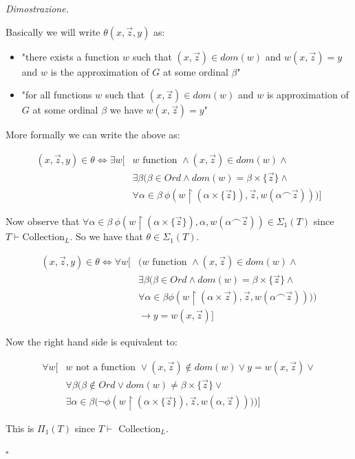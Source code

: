 \documentclass[a4paper,12pt]{article}
\newenvironment{proof}
  {\par\vspace{0.5em}\noindent\textit{Dimostrazione.} }
  {\par\vspace{1em}\hfill$\square$}
\begin{document}
\begin{proof}

	Basically we will write $\theta(x,\vec{z},y)$ as:
	\begin{itemize}
		\item	"there exists a function $w$ such that $(x,\vec{z}) \in dom(w)$ and $w(x,\vec{z}) = y$ and $w$ is the approximation of $G$ at some ordinal $\beta$"
		\item	"for all functions $w$ such that $(x,\vec{z}) \in dom(w)$ and $w$ is approximation of $G$ at some ordinal $\beta$ we have $w(x,\vec{z}) = y$"
	\end{itemize}

	More formally we can write the above as:

	\begin{align*}
		(x,\vec{z},y) \in \theta \iff \exists w \bigg[& w \text{ function } \land (x, \vec{z}) \in dom(w) \land \\
							& \exists \beta \bigg( \beta \in Ord \land dom(w) = \beta \times \{\vec{z}\} \land \\
							& \forall \alpha \in \beta \ \phi(w \restriction (\alpha \times \{\vec{z} \} ),\vec{z}, w(\alpha \frown \vec{z}) ) \bigg)\bigg] 
	\end{align*}

	Now observe that $\forall \alpha \in \beta \ \phi(w \restriction (\alpha \times \{\vec{z} \} ),\alpha, w(\alpha \frown \vec{z}) ) \in \Sigma_1(T)$ since $T \vdash \text{Collection}_L$.
	So we have that $\theta \in \Sigma_1(T)$.

	\begin{align*}
		(x,\vec{z},y) \in \theta \iff \forall w \bigg[& \bigg(w \text{ function } \land (x,\vec{z}) \in dom(w) \land \\
							& \exists \beta \big( \beta \in Ord \land dom(w) = \beta \times \{ \vec{z} \} \land \\
							& \forall \alpha \in \beta \phi(w \restriction (\alpha \times \vec{z} ), \vec{z}, w(\alpha \frown \vec{z}) ) \big) \bigg) \\
							& \to  y = w(x, \vec{z}) \bigg]
	\end{align*}

	Now the right hand side is equivalent to:

	\begin{align*}
		\forall w \bigg[& w \text{ not a function } \lor (x,\vec{z}) \not \in dom(w) \lor y = w(x,\vec{z}) \lor \\
				& \forall \beta \bigg( \beta \not \in Ord \lor dom(w) \not = \beta \times \{\vec{z}\} \lor \\
				& \exists \alpha \in \beta \big( \neg \phi(w \restriction (\alpha \times \{\vec{z}\}), \vec{z}, w(\alpha, \vec{z})) \big) \bigg) \bigg]
	\end{align*}


	This is $\Pi_1(T)$ since $T \vdash \text{ Collection}_L$.


\end{proof}
\end{document}
